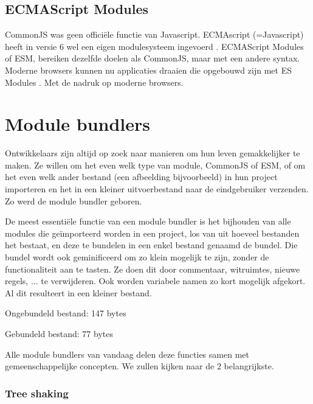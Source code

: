 

\subsection{ECMAScript Modules}

CommonJS was geen officiële functie van Javascript. ECMAscript (=Javascript) heeft in versie 6 wel een eigen modulesysteem ingevoerd \autocite{orendorff-2015}. ECMAScript Modules of ESM, bereiken dezelfde doelen als CommonJS, maar met een andere syntax. Moderne browsers kunnen nu applicaties draaien die opgebouwd zijn met ES Modules \autocite{mozilla-2021}. Met de nadruk op moderne browsers.





\section{Module bundlers}

Ontwikkelaars zijn altijd op zoek naar manieren om hun leven gemakkelijker te maken. Ze willen om het even welk type van module, CommonJS of ESM, of om het even welk ander bestand (een afbeelding bijvoorbeeld) in hun project importeren en het in een kleiner uitvoerbestand naar de eindgebruiker verzenden. Zo werd de module bundler geboren.

De meest essentiële functie van een module bundler is het bijhouden van alle modules die geïmporteerd worden in een project, los van uit hoeveel bestanden het bestaat, en deze te bundelen in een enkel bestand genaamd de bundel. Die bundel wordt ook geminificeerd om zo klein mogelijk te zijn, zonder de functionaliteit aan te tasten. Ze doen dit door commentaar, witruimtes, nieuwe regels, ... te verwijderen. Ook worden variabele namen zo kort mogelijk afgekort. Al dit resulteert in een kleiner bestand.

Ongebundeld bestand: 147 bytes

Gebundeld bestand: 77 bytes


Alle module bundlers van vandaag delen deze functies samen met gemeenschappelijke concepten. We zullen kijken naar de 2 belangrijkste. 

\subsubsection{Tree shaking}

